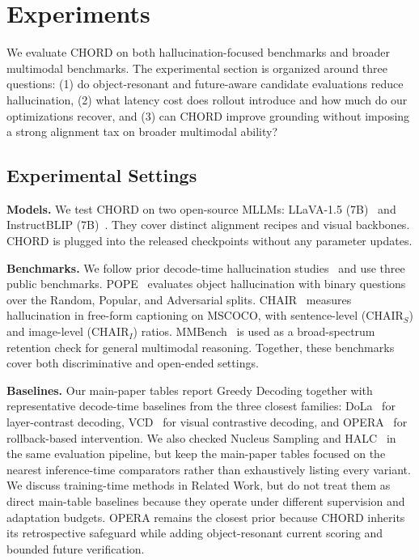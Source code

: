 \documentclass[sigconf,anonymous]{acmart}
\begin{document}
\section{Experiments}
\label{sec:experiments}

We evaluate CHORD on both hallucination-focused benchmarks and broader multimodal benchmarks. The experimental section is organized around three questions: (1) do object-resonant and future-aware candidate evaluations reduce hallucination, (2) what latency cost does rollout introduce and how much do our optimizations recover, and (3) can CHORD improve grounding without imposing a strong alignment tax on broader multimodal ability?

\subsection{Experimental Settings}

\noindent\textbf{Models.} We test CHORD on two open-source MLLMs: LLaVA-1.5 (7B)~\cite{liu2023improvedllava} and InstructBLIP (7B)~\cite{instructblip}. They cover distinct alignment recipes and visual backbones. CHORD is plugged into the released checkpoints without any parameter updates.

\noindent\textbf{Benchmarks.} We follow prior decode-time hallucination studies~\cite{huang2024opera_cvpr,leng2023mitigating} and use three public benchmarks.
POPE~\cite{li2023pope} evaluates object hallucination with binary questions over the Random, Popular, and Adversarial splits.
CHAIR~\cite{rohrbach2018object} measures hallucination in free-form captioning on MSCOCO, with sentence-level ($\text{CHAIR}_S$) and image-level ($\text{CHAIR}_I$) ratios.
MMBench~\cite{liu2023mmbench} is used as a broad-spectrum retention check for general multimodal reasoning. Together, these benchmarks cover both discriminative and open-ended settings.

\noindent\textbf{Baselines.} Our main-paper tables report Greedy Decoding together with representative decode-time baselines from the three closest families: DoLa~\cite{chuang2023dola} for layer-contrast decoding, VCD~\cite{leng2023mitigating} for visual contrastive decoding, and OPERA~\cite{huang2024opera_cvpr} for rollback-based intervention. We also checked Nucleus Sampling and HALC~\cite{chen2024halc} in the same evaluation pipeline, but keep the main-paper tables focused on the nearest inference-time comparators rather than exhaustively listing every variant. We discuss training-time methods in Related Work, but do not treat them as direct main-table baselines because they operate under different supervision and adaptation budgets. OPERA remains the closest prior because CHORD inherits its retrospective safeguard while adding object-resonant current scoring and bounded future verification.
\end{document}
